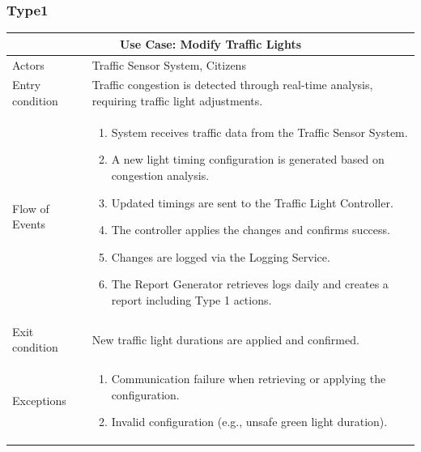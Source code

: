 \documentclass[11.5pt]{article}
\begin{document}
    \subsubsection{Type1}
    \begin{table}[!htp]
        \centering
        \begin{tabular}{@{} l p{23em} @{}}
            \toprule \multicolumn{2}{c}{Use Case: \textbf{Modify Traffic Lights}} \\
            \midrule                                                                          %
            Actors                                                                           &  Traffic Sensor System, Citizens \\
            Entry condition                                                                  &  Traffic congestion is detected through real-time analysis, requiring traffic light adjustments.\\
            Flow of Events                                                                   & \begin{enumerate}[left=0pt, parsep=0pt, topsep=0pt]
            \item System receives traffic data from the Traffic Sensor System.
            \item A new light timing configuration is generated based on congestion analysis.
            \item Updated timings are sent to the Traffic Light Controller.
            \item The controller applies the changes and confirms success.
            \item Changes are logged via the Logging Service.
            \item The Report Generator retrieves logs daily and creates a report including Type 1 actions.
            \end{enumerate} \\
            Exit condition                                                                   &  New traffic light durations are applied and confirmed. \\
            Exceptions                                                                       &  \begin{enumerate}[left=0pt, parsep=0pt, topsep=0pt]
            \item Communication failure when retrieving or applying the configuration.
            \item Invalid configuration (e.g., unsafe green light duration).

\end{enumerate}
\end{tabular}
\end{table}
\end{document}
